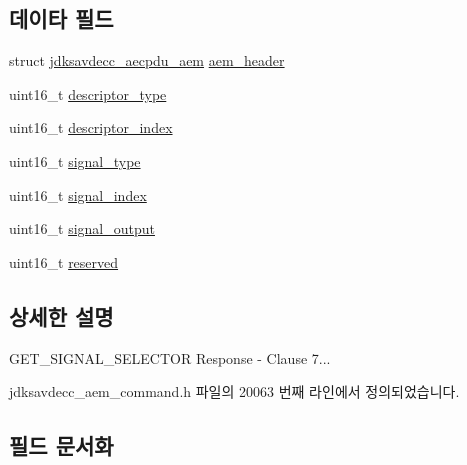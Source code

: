 \subsection*{데이타 필드}
\begin{DoxyCompactItemize}
\item 
struct \hyperlink{structjdksavdecc__aecpdu__aem}{jdksavdecc\+\_\+aecpdu\+\_\+aem} \hyperlink{structjdksavdecc__aem__command__get__signal__selector__response_ae1e77ccb75ff5021ad923221eab38294}{aem\+\_\+header}
\item 
uint16\+\_\+t \hyperlink{structjdksavdecc__aem__command__get__signal__selector__response_ab7c32b6c7131c13d4ea3b7ee2f09b78d}{descriptor\+\_\+type}
\item 
uint16\+\_\+t \hyperlink{structjdksavdecc__aem__command__get__signal__selector__response_a042bbc76d835b82d27c1932431ee38d4}{descriptor\+\_\+index}
\item 
uint16\+\_\+t \hyperlink{structjdksavdecc__aem__command__get__signal__selector__response_a248e60ef99d5ed1779989d1dd6b6dc5a}{signal\+\_\+type}
\item 
uint16\+\_\+t \hyperlink{structjdksavdecc__aem__command__get__signal__selector__response_ae2e81a95ee9ad83f1fe22b6a1ee29075}{signal\+\_\+index}
\item 
uint16\+\_\+t \hyperlink{structjdksavdecc__aem__command__get__signal__selector__response_ab4b91864e6fc335d7e86536d9f4461e4}{signal\+\_\+output}
\item 
uint16\+\_\+t \hyperlink{structjdksavdecc__aem__command__get__signal__selector__response_a5a6ed8c04a3db86066924b1a1bf4dad3}{reserved}
\end{DoxyCompactItemize}


\subsection{상세한 설명}
G\+E\+T\+\_\+\+S\+I\+G\+N\+A\+L\+\_\+\+S\+E\+L\+E\+C\+T\+OR Response -\/ Clause 7... 

jdksavdecc\+\_\+aem\+\_\+command.\+h 파일의 20063 번째 라인에서 정의되었습니다.



\subsection{필드 문서화}
